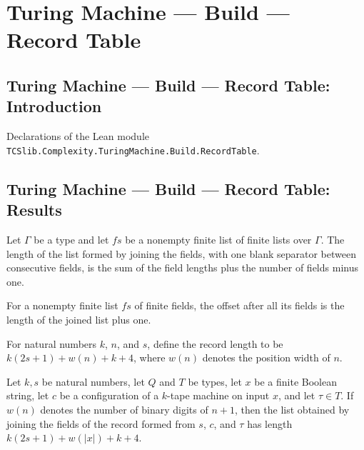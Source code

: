 \section{Turing Machine --- Build --- Record Table}
\subsection*{Turing Machine --- Build --- Record Table: Introduction}

Declarations of the Lean module \texttt{TCSlib.Complexity.TuringMachine.Build.RecordTable}.

\subsection*{Turing Machine --- Build --- Record Table: Results}

\begin{theorem}
\label{Turing.joinFields_length}
\leanok
{}
Let $\Gamma$ be a type and let $fs$ be a nonempty finite list of finite lists over
$\Gamma$. The length of the list formed by joining the fields, with one blank separator
between consecutive fields, is the sum of the field lengths plus the number of fields
minus one.
\end{theorem}

\begin{theorem}
\label{Turing.fieldOffset_length}
\leanok
{}
For a nonempty finite list $fs$ of finite fields, the offset after all its fields is the
length of the joined list plus one.
\end{theorem}

\begin{definition}
\label{Turing.recordLength}
\leanok
{}
For natural numbers $k$, $n$, and $s$, define the record length to be
$k(2s+1)+w(n)+k+4$, where $w(n)$ denotes the position width of $n$.
\end{definition}

\begin{theorem}
\label{Turing.joinFields_cfgRecord_length}
\leanok
{}
Let $k,s$ be natural numbers, let $Q$ and $T$ be types, let $x$ be a finite Boolean
string, let $c$ be a configuration of a $k$-tape machine on input $x$, and let $\tau\in
T$. If $w(n)$ denotes the number of binary digits of $n+1$, then the list obtained by
joining the fields of the record formed from $s$, $c$, and $\tau$ has length
$k(2s+1)+w(|x|)+k+4$.
\end{theorem}

